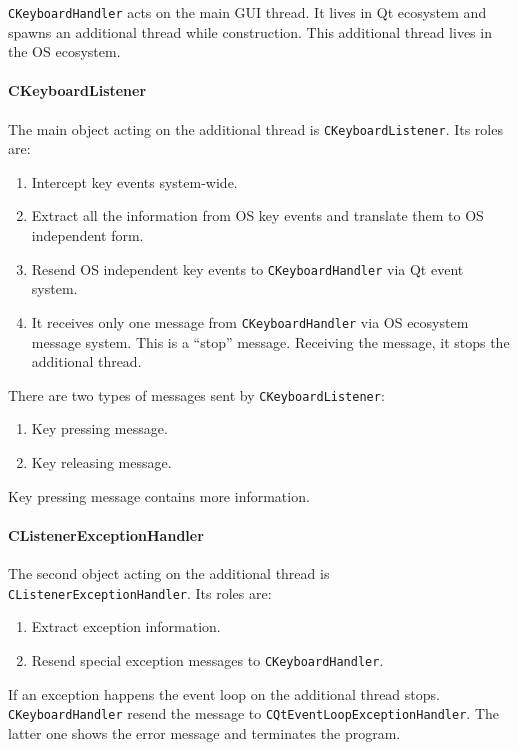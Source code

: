 \documentclass{article}
\begin{document}
\verb"CKeyboardHandler" acts on the main GUI thread. It lives in Qt ecosystem and spawns an additional thread while construction. This additional thread lives in the OS ecosystem. 

\paragraph{CKeyboardListener}
The main object acting on the additional thread is \verb"CKeyboardListener". Its roles are:
\begin{enumerate}
\item Intercept key events system-wide.

\item Extract all the information from OS key events and translate them to OS independent form.

\item Resend OS independent key events to \verb"CKeyboardHandler" via Qt event system.

\item It receives only one message from \verb"CKeyboardHandler" via OS ecosystem message system. This is a ``stop'' message. Receiving the message, it stops the additional thread.
\end{enumerate}

There are two types of messages sent by \verb"CKeyboardListener":
\begin{enumerate}
\item Key pressing message.
\item Key releasing message.
\end{enumerate}
Key pressing message contains more information.

\paragraph{CListenerExceptionHandler}
The second object acting on the additional thread is \verb"CListenerExceptionHandler". Its roles are:
\begin{enumerate}
\item Extract exception information.
\item Resend special exception messages to \verb"CKeyboardHandler".
\end{enumerate}
If an exception happens the event loop on the additional thread stops. \verb"CKeyboardHandler" resend the message to \verb"CQtEventLoopExceptionHandler". The latter one shows the error message and terminates the program.
\end{document}
